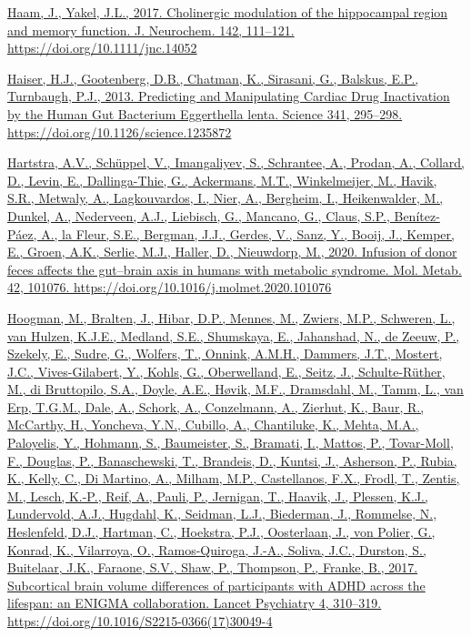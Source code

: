 \documentclass[
]{article}
\begin{document}
\href{https://www.zotero.org/google-docs/?uydJ8e}{Haam, J., Yakel, J.L.,
2017. Cholinergic modulation of the hippocampal region and memory
function. J. Neurochem. 142, 111--121.
https://doi.org/10.1111/jnc.14052}

\href{https://www.zotero.org/google-docs/?uydJ8e}{Haiser, H.J.,
Gootenberg, D.B., Chatman, K., Sirasani, G., Balskus, E.P., Turnbaugh,
P.J., 2013. Predicting and Manipulating Cardiac Drug Inactivation by the
Human Gut Bacterium Eggerthella lenta. Science 341, 295--298.
https://doi.org/10.1126/science.1235872}

\href{https://www.zotero.org/google-docs/?uydJ8e}{Hartstra, A.V.,
Schüppel, V., Imangaliyev, S., Schrantee, A., Prodan, A., Collard, D.,
Levin, E., Dallinga-Thie, G., Ackermans, M.T., Winkelmeijer, M., Havik,
S.R., Metwaly, A., Lagkouvardos, I., Nier, A., Bergheim, I.,
Heikenwalder, M., Dunkel, A., Nederveen, A.J., Liebisch, G., Mancano,
G., Claus, S.P., Benítez-Páez, A., la Fleur, S.E., Bergman, J.J.,
Gerdes, V., Sanz, Y., Booij, J., Kemper, E., Groen, A.K., Serlie, M.J.,
Haller, D., Nieuwdorp, M., 2020. Infusion of donor feces affects the
gut--brain axis in humans with metabolic syndrome. Mol. Metab. 42,
101076. https://doi.org/10.1016/j.molmet.2020.101076}

\href{https://www.zotero.org/google-docs/?uydJ8e}{Hoogman, M., Bralten,
J., Hibar, D.P., Mennes, M., Zwiers, M.P., Schweren, L., van Hulzen,
K.J.E., Medland, S.E., Shumskaya, E., Jahanshad, N., de Zeeuw, P.,
Szekely, E., Sudre, G., Wolfers, T., Onnink, A.M.H., Dammers, J.T.,
Mostert, J.C., Vives-Gilabert, Y., Kohls, G., Oberwelland, E., Seitz,
J., Schulte-Rüther, M., di Bruttopilo, S.A., Doyle, A.E., Høvik, M.F.,
Dramsdahl, M., Tamm, L., van Erp, T.G.M., Dale, A., Schork, A.,
Conzelmann, A., Zierhut, K., Baur, R., McCarthy, H., Yoncheva, Y.N.,
Cubillo, A., Chantiluke, K., Mehta, M.A., Paloyelis, Y., Hohmann, S.,
Baumeister, S., Bramati, I., Mattos, P., Tovar-Moll, F., Douglas, P.,
Banaschewski, T., Brandeis, D., Kuntsi, J., Asherson, P., Rubia, K.,
Kelly, C., Di Martino, A., Milham, M.P., Castellanos, F.X., Frodl, T.,
Zentis, M., Lesch, K.-P., Reif, A., Pauli, P., Jernigan, T., Haavik, J.,
Plessen, K.J., Lundervold, A.J., Hugdahl, K., Seidman, L.J., Biederman,
J., Rommelse, N., Heslenfeld, D.J., Hartman, C., Hoekstra, P.J.,
Oosterlaan, J., von Polier, G., Konrad, K., Vilarroya, O.,
Ramos-Quiroga, J.-A., Soliva, J.C., Durston, S., Buitelaar, J.K.,
Faraone, S.V., Shaw, P., Thompson, P., Franke, B., 2017. Subcortical
brain volume differences of participants with ADHD across the lifespan:
an ENIGMA collaboration. Lancet Psychiatry 4, 310--319.
https://doi.org/10.1016/S2215-0366(17)30049-4}
\end{document}
